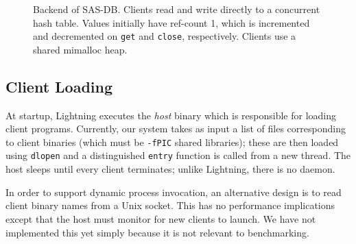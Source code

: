 \begin{figure}[ht]
\caption{\label{fig:backend-arch} Backend of SAS-DB. Clients read and write
directly to a concurrent hash table. Values initially have ref-count 1, which is
incremented and decremented on \texttt{get} and \texttt{close}, respectively.
Clients use a shared mimalloc heap.}
\end{figure}

\subsection{Client Loading}
At startup, Lightning executes the \emph{host} binary which is responsible for
loading client programs. Currently, our system takes as input a list of files
corresponding to client binaries (which must be \texttt{-fPIC} shared
libraries); these are then loaded using \texttt{dlopen} and a distinguished
\texttt{entry} function is called from a new thread. The host sleeps until every
client terminates; unlike Lightning, there is no daemon.

In order to support dynamic process invocation, an alternative design is to read
client binary names from a Unix socket. This has no performance implications
except that the host must monitor for new clients to launch. We have not
implemented this yet simply because it is not relevant to benchmarking.

